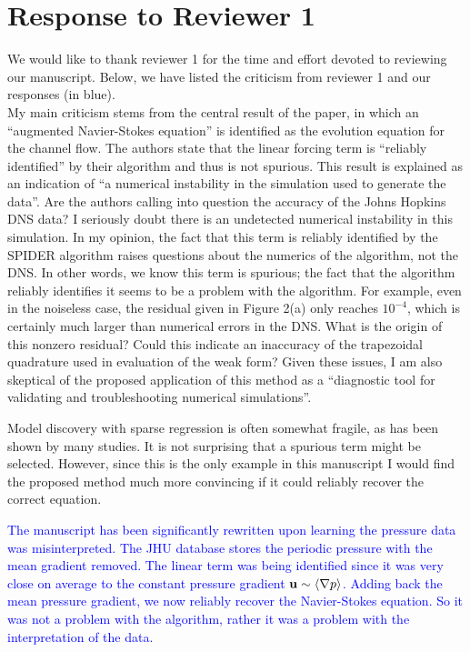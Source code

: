\documentclass{article}
\newcommand{\response}{\textcolor{blue}}
\begin{document}
\section*{Response to Reviewer 1}
We would like to thank reviewer 1 for the time and effort devoted to reviewing our manuscript. Below, we have listed the criticism from reviewer 1 and our responses (in blue).\\

My main criticism stems from the central result of the paper, in which
an “augmented Navier-Stokes equation” is identified as the evolution
equation for the channel flow.  The authors state that the linear
forcing term is “reliably identified” by their algorithm and thus is
not spurious.  This result is explained as an indication of “a
numerical instability in the simulation used to generate the data”.
Are the authors calling into question the accuracy of the Johns
Hopkins DNS data?  I seriously doubt there is an undetected numerical
instability in this simulation.  In my opinion, the fact that this
term is reliably identified by the SPIDER algorithm raises questions
about the numerics of the algorithm, not the DNS.  In other words, we
know this term is spurious; the fact that the algorithm reliably
identifies it seems to be a problem with the algorithm.  For example,
even in the noiseless case, the residual given in Figure 2(a) only
reaches $10^{-4}$, which is certainly much larger than numerical errors
in the DNS.  What is the origin of this nonzero residual?  Could this
indicate an inaccuracy of the trapezoidal quadrature used in
evaluation of the weak form?  Given these issues, I am also skeptical
of the proposed application of this method as a “diagnostic tool for
validating and troubleshooting numerical simulations”.

Model discovery with sparse regression is often somewhat fragile, as
has been shown by many studies.  It is not surprising that a spurious
term might be selected.  However, since this is the only example in
this manuscript I would find the proposed method much more convincing
if it could reliably recover the correct equation. 

\medskip
\response{
The manuscript has been significantly rewritten upon learning the pressure data was misinterpreted. The JHU database stores the periodic pressure with the mean gradient removed. The linear term was being identified since it was very close on average to the constant pressure gradient ${\bf u} \sim \langle \nabla p \rangle$. Adding back the mean pressure gradient, we now reliably recover the Navier-Stokes equation. So it was not a problem with the algorithm, rather it was a problem with the interpretation of the data.}
\end{document}

